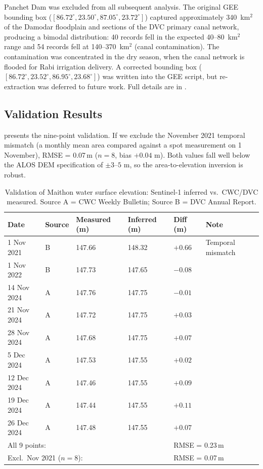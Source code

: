 \documentclass[12pt,a4paper,oneside]{report}
\begin{document}
Panchet Dam was excluded from all subsequent analysis. The original GEE
bounding box ($[86.72^\circ, 23.50^\circ, 87.05^\circ, 23.72^\circ]$)
captured approximately 340~km$^2$ of the Damodar floodplain and sections of
the DVC primary canal network, producing a bimodal distribution: 40 records
fell in the expected 40--80~km$^2$ range and 54 records fell at
140--370~km$^2$ (canal contamination). The contamination was concentrated in
the dry season, when the canal network is flooded for Rabi irrigation
delivery. A corrected bounding box
($[86.72^\circ, 23.52^\circ, 86.95^\circ, 23.68^\circ]$) was written into
the GEE script, but re-extraction was deferred to future work. Full details
are in .

\subsection{Validation Results}
\label{sec:results_validation}

 presents the nine-point validation. If we
exclude the November 2021 temporal mismatch (a monthly mean area compared
against a spot measurement on 1 November), RMSE = 0.07\,m
($n = 8$, bias $+0.04$ m). Both values fall well below the ALOS DEM
specification of $\pm 3$--$5$ m, so the area-to-elevation inversion is
robust.

\begin{table}[htbp]
  \centering
  \caption{Validation of Maithon water surface elevation: Sentinel-1 inferred
  vs.\ CWC/DVC measured. Source A = CWC Weekly Bulletin; Source B = DVC
  Annual Report.}
  \label{tab:thesis_validation}
  \begin{tabularx}{\linewidth}{lXXXXX}
    \toprule
    Date & Source & Measured (m) & Inferred (m) & Diff (m) & Note \\
    \midrule
    1 Nov 2021  & B & 147.66 & 148.32 & $+0.66$ & Temporal mismatch \\
    1 Nov 2022  & B & 147.73 & 147.65 & $-0.08$ & \\
    14 Nov 2024 & A & 147.76 & 147.75 & $-0.01$ & \\
    21 Nov 2024 & A & 147.72 & 147.75 & $+0.03$ & \\
    28 Nov 2024 & A & 147.68 & 147.75 & $+0.07$ & \\
    5 Dec 2024  & A & 147.53 & 147.55 & $+0.02$ & \\
    12 Dec 2024 & A & 147.46 & 147.55 & $+0.09$ & \\
    19 Dec 2024 & A & 147.44 & 147.55 & $+0.11$ & \\
    26 Dec 2024 & A & 147.48 & 147.55 & $+0.07$ & \\
    \midrule
    \multicolumn{4}{l}{All 9 points:} & \multicolumn{2}{l}{RMSE = 0.23\,m} \\
    \multicolumn{4}{l}{Excl.\ Nov 2021 ($n=8$):} & \multicolumn{2}{l}{RMSE = 0.07\,m} \\
    \bottomrule
  \end{tabularx}
\end{table}
\end{document}
